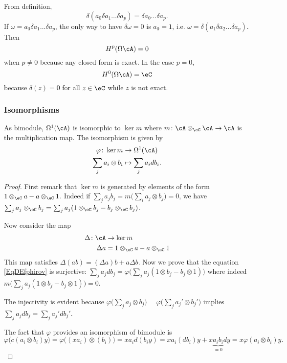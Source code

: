 From definition,
\[
  \delta(a_0\delta a_1\ldots\delta a_p)=\delta a_0\ldots\delta a_p.
\]
If $\omega=a_0\delta a_1\ldots\delta a_p$, the only way to have $\delta\omega=0$ is $a_0=1$, i.e. $\omega=\delta(a_1\delta a_2\ldots\delta a_p)$. Then
\[
  H^p(\Omega\cA)=0
\]
when $p\neq 0$ because any closed form is exact. In the case $p=0$,
\[
  H^0(\Omega\cA)=\eC
\]
because $\delta(z)=0$ for all $z\in\eC$ while $z$ is not exact.

\subsubsection{Isomorphisms}

\begin{lemma}
As bimodule, $\Omega^1(\cA)$ is isomorphic to $\ker m$ where $m\colon \cA\otimes_{\eC}\cA\to \cA$ is the multiplication map. The isomorphism is given by
\begin{equation}   \label{EqDEfphirov}
\begin{aligned}
 \varphi\colon \ker m&\to \Omega^1(\cA) \\
\sum_{j}a_i\otimes b_i&\mapsto \sum_{j}a_idb_i.
\end{aligned}
\end{equation}

\end{lemma}

\begin{proof}
First remark that $\ker m$ is generated by elements of the form $1\otimes_{\eC}a-a\otimes_{\eC}1$. Indeed if $\sum_{j}a_jb_j=m\big( \sum_{i}a_j\otimes b_j \big)=0$, we have $\sum_{j}a_j\otimes_{\eC}b_j=\sum_{j}a_j(1\otimes_{\eC} b_j-b_j\otimes_{\eC}b_j)$.

Now consider the map
\begin{equation}
\begin{aligned}
 \Delta\colon \cA&\to \ker m \\
\Delta a&= 1\otimes_{\eC}a-a\otimes_{\eC}1
\end{aligned}
\end{equation}
This map satisfies $\Delta(ab)=(\Delta a)b+a\Delta b$. Now we prove that the equation \eqref{EqDEfphirov} is surjective: $\sum_{j}a_jdb_j=\varphi\big( \sum_{j}a_j(1\otimes b_j-b_j\otimes 1) \big)$ where indeed $m\big( \sum_{j}a_j(1\otimes b_j-b_j\otimes 1) \big)=0$.

The injectivity is evident because $\varphi\big( \sum_{j}a_j\otimes b_j \big)=\varphi\big( \sum_{j}a_j'\otimes b_j' \big)$ implies $\sum_{j}a_jdb_j=\sum_{j}a_j'db_j'$.

The fact that $\varphi$ provides an isomorphism of bimodule is
\[
	\varphi\big( c(a_i\otimes b_i)y \big)=\varphi\big( (xa_i)\otimes(b_i) \big)
		=xa_id(b_iy)
		=xa_i(db_i)y+x\underbrace{a_ib_i}_{=0}dy
		=x\varphi(a_i\otimes b_i)y.
\]
\end{proof}

